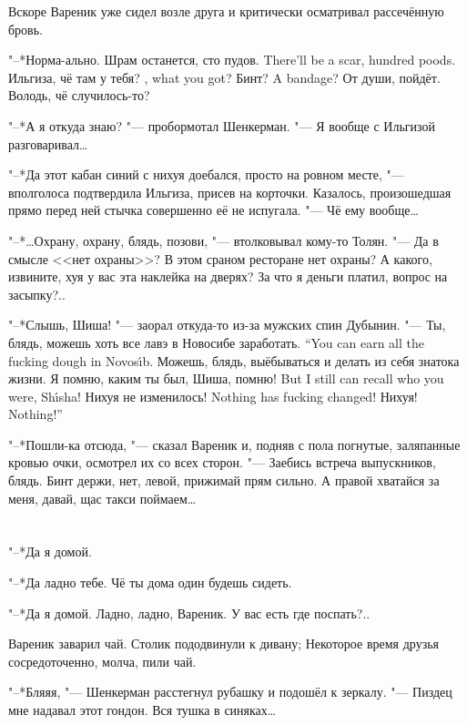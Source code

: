 Вскоре Вареник уже сидел возле друга и критически осматривал рассечённую бровь.

"--*Норма-ально.
{Шрам останется, сто пудов.}
{There'll be a scar, hundred poods.}
{Ильгиза, чё там у тебя?}
{\Ilgiza, what you got?}
{Бинт?}
{A bandage?}
От души, пойдёт.
Володь, чё случилось-то?

"--*А я откуда знаю? "--- пробормотал Шенкерман.
"--- Я вообще с Ильгизой разговаривал\ldots{}

"--*Да этот кабан синий с нихуя доебался, просто на ровном месте, "--- вполголоса подтвердила Ильгиза, присев на корточки.
Казалось, произошедшая прямо перед ней стычка совершенно её не испугала.
"--- Чё ему вообще\ldots{}

"--*\ldots{}Охрану, охрану, блядь, позови, "--- втолковывал кому-то Толян.
"--- Да в смысле <<нет охраны>>?
В этом сраном ресторане нет охраны?
А какого, извините, хуя у вас эта наклейка на дверях?
За что я деньги платил, вопрос на засыпку?..

"--*Слышь, Шиша! "--- заорал откуда-то из-за мужских спин Дубынин.
{"--- Ты, блядь, можешь хоть все лавэ в Новосибе заработать.}
{``You can earn all the fucking dough in Novos\'{\i}b.}
Можешь, блядь, выёбываться и делать из себя знатока жизни.
{Я помню, каким ты был, Шиша, помню!}
{But I still can recall who you were, Sh\'{\i}sha!}
{Нихуя не изменилось!}
{Nothing has fucking changed!}
{Нихуя!}
{Nothing!''}

"--*Пошли-ка отсюда, "--- сказал Вареник и, подняв с пола погнутые, заляпанные кровью очки, осмотрел их со всех сторон.
"--- Заебись встреча выпускников, блядь.
Бинт держи, нет, левой, прижимай прям сильно.
А правой хватайся за меня, давай, щас такси поймаем\ldots{}

\chapter{}

\label{Sun_2012_07_22}

"--*Да я домой.

"--*Да ладно тебе.
Чё ты дома один будешь сидеть.

"--*Да я домой.
Ладно, ладно, Вареник.
У вас есть где поспать?..

Вареник заварил чай.
Столик пододвинули к дивану;
Некоторое время друзья сосредоточенно, молча, пили чай.

"--*Бляяя, "--- Шенкерман расстегнул рубашку и подошёл к зеркалу.
"--- Пиздец мне надавал этот гондон.
Вся тушка в синяках\ldots{}

